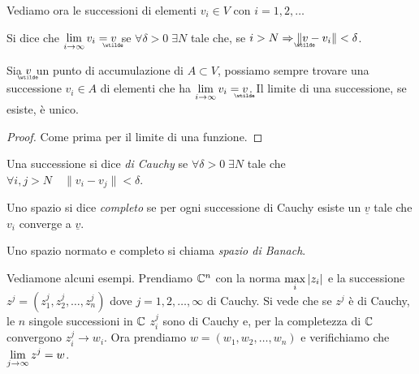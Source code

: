 Vediamo ora le successioni di elementi $v_i \in V$ con $i = 1,2, \ldots$
\begin{definition}
Si dice che $\ds \lim_{i \to \infty} v_i = \utld{v}$
se $\forall \delta > 0 \; \exists N$ tale che, se $i > N \Rightarrow
\| \utld{v} - v_i\| < \delta$.
\end{definition}
\begin{theorem}
Sia $\utld{v}$ un punto di accumulazione di $A \subset V$,
possiamo sempre trovare una successione $v_i \in A$ di elementi che ha
$\ds \lim_{i \to \infty} v_i = \utld{v}$.
Il limite di una successione, se esiste, è unico.
\end{theorem}
\begin{proof}
Come prima per il limite di una funzione.	
\end{proof}
\begin{definition}
Una successione si dice \emph{di Cauchy} se $\forall \delta > 0 \; \exists N$
tale che $\forall i, j > N \quad \|v_i - v_j\| < \delta$.
\end{definition}
\begin{definition}[completezza]
Uno spazio si dice \emph{completo} se per ogni successione di Cauchy esiste un
$\underline{v}$ tale che $v_i$ converge a $\underline{v}$.
\end{definition}
\begin{definition}
Uno spazio normato e completo si chiama \emph{spazio di Banach}.
\end{definition}

Vediamone alcuni esempi. Prendiamo $\mathbb C^n$ con la norma $\displaystyle \max_i
{\left|z_i\right|}$ e la successione $z^j =  \left(z_1^j, z_2^j, \ldots, z_n^j \right)$
dove $j = 1, 2, \ldots, \infty$ di Cauchy. Si vede che se $z^j$ è di Cauchy,
le $n$ singole successioni in $\mathbb C$ $z_i^j$ sono di Cauchy e, per la
completezza di $\mathbb C$ convergono $z_i^j \to w_i$.
Ora prendiamo $w = \left(w_1, w_2, \ldots, w_n \right)$ e verifichiamo che
$\displaystyle \lim_{j \to \infty} z^j = w$.

